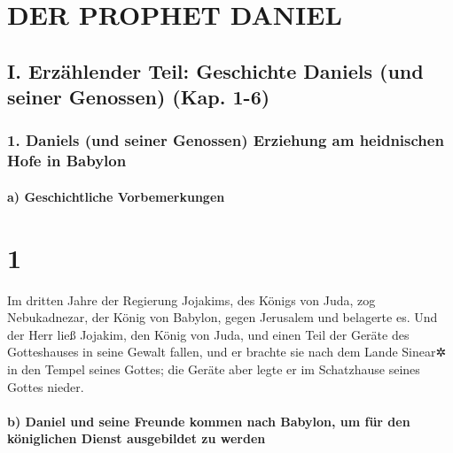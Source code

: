 \hypertarget{der-prophet-daniel}{%
\section{DER PROPHET DANIEL}\label{der-prophet-daniel}}

\hypertarget{i.-erzuxe4hlender-teil-geschichte-daniels-und-seiner-genossen-kap.-1-6}{%
\subsection{I. Erzählender Teil: Geschichte Daniels (und seiner
Genossen) (Kap.
1-6)}\label{i.-erzuxe4hlender-teil-geschichte-daniels-und-seiner-genossen-kap.-1-6}}

\hypertarget{daniels-und-seiner-genossen-erziehung-am-heidnischen-hofe-in-babylon}{%
\subsubsection{1. Daniels (und seiner Genossen) Erziehung am heidnischen
Hofe in
Babylon}\label{daniels-und-seiner-genossen-erziehung-am-heidnischen-hofe-in-babylon}}

\hypertarget{a-geschichtliche-vorbemerkungen}{%
\paragraph{a) Geschichtliche
Vorbemerkungen}\label{a-geschichtliche-vorbemerkungen}}

\hypertarget{section}{%
\section{1}\label{section}}

Im dritten Jahre der Regierung Jojakims, des Königs von
Juda, zog Nebukadnezar, der König von Babylon, gegen Jerusalem und
belagerte es. Und der Herr ließ Jojakim, den König von
Juda, und einen Teil der Geräte des Gotteshauses in seine Gewalt fallen,
und er brachte sie nach dem Lande Sinear✲ in den Tempel seines Gottes;
die Geräte aber legte er im Schatzhause seines Gottes nieder.

\hypertarget{b-daniel-und-seine-freunde-kommen-nach-babylon-um-fuxfcr-den-kuxf6niglichen-dienst-ausgebildet-zu-werden}{%
\paragraph{b) Daniel und seine Freunde kommen nach Babylon, um für den
königlichen Dienst ausgebildet zu
werden}\label{b-daniel-und-seine-freunde-kommen-nach-babylon-um-fuxfcr-den-kuxf6niglichen-dienst-ausgebildet-zu-werden}}

